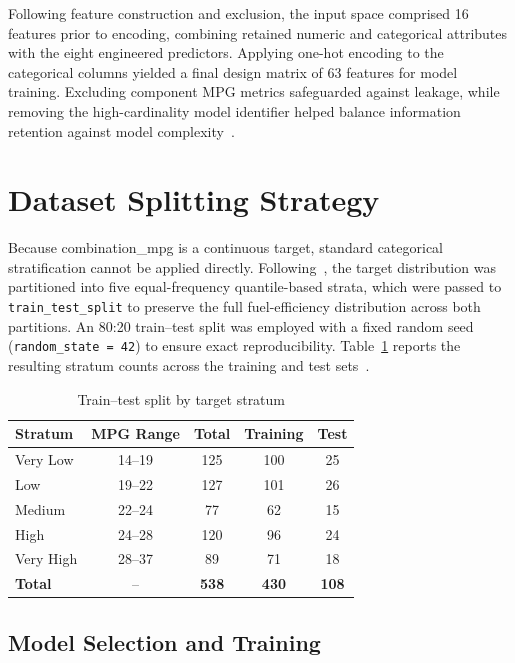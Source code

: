 Following feature construction and exclusion, the input space comprised 16 features prior to encoding, combining retained numeric and categorical attributes with the eight engineered predictors. Applying one-hot encoding to the categorical columns yielded a final design matrix of 63 features for model training. Excluding component MPG metrics safeguarded against leakage, while removing the high-cardinality model identifier helped balance information retention against model complexity~\cite{atique2026explainable}.


\section{Dataset Splitting Strategy}

Because combination\_mpg is a continuous target, standard categorical stratification cannot be applied directly. Following~\cite{atique2026explainable}, the target distribution was partitioned into five equal-frequency quantile-based strata, which were passed to \texttt{train\_test\_split} to preserve the full fuel-efficiency distribution across both partitions. An 80:20 train--test split was employed with a fixed random seed (\texttt{random\_state = 42}) to ensure exact reproducibility. Table~\ref{tab:dataset_split} reports the resulting stratum counts across the training and test sets~\cite{atique2026explainable}.

\begin{table}[H]
\centering
\begin{tabular}{|l|c|c|c|c|}
\hline
\textbf{Stratum} & \textbf{MPG Range} & \textbf{Total} & \textbf{Training} & \textbf{Test} \\
\hline
Very Low  & 14--19 & 125 & 100 & 25 \\
\hline
Low       & 19--22 & 127 & 101 & 26 \\
\hline
Medium    & 22--24 & 77  & 62  & 15 \\
\hline
High      & 24--28 & 120 & 96  & 24 \\
\hline
Very High & 28--37 & 89  & 71  & 18 \\
\hline
\textbf{Total} & -- & \textbf{538} & \textbf{430} & \textbf{108} \\
\hline
\end{tabular}
\caption{Train--test split by target stratum}
\label{tab:dataset_split}
\end{table}


\subsection{Model Selection and Training}

